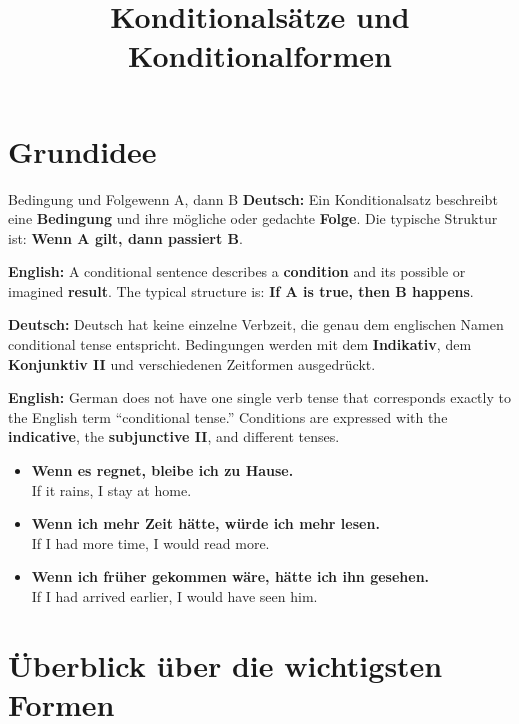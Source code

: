 \documentclass[a4paper,11pt]{article}
\title{Konditionalsätze und Konditionalformen}
\date{}
\newcommand{\GermanText}[1]{\textbf{Deutsch: }#1\par}
\newcommand{\EnglishText}[1]{{\small\color{SoftGray}\textbf{English: }#1\par}}
\newcommand{\ExampleItem}[2]{\item \textbf{#1}\\{\small\color{SoftGray}#2}}
\begin{document}
    \maketitle
    \tableofcontents
    \newpage

    \section{Grundidee}

        \begin{grammarentry}{Bedingung und Folge}{wenn A, dann B}
            \GermanText{Ein Konditionalsatz beschreibt eine \textbf{Bedingung} und ihre mögliche oder gedachte \textbf{Folge}. Die typische Struktur ist: \textbf{Wenn A gilt, dann passiert B}.}
            \EnglishText{A conditional sentence describes a \textbf{condition} and its possible or imagined \textbf{result}. The typical structure is: \textbf{If A is true, then B happens}.}

            \GermanText{Deutsch hat keine einzelne Verbzeit, die genau dem englischen Namen \glqq conditional tense\grqq{} entspricht. Bedingungen werden mit dem \textbf{Indikativ}, dem \textbf{Konjunktiv II} und verschiedenen Zeitformen ausgedrückt.}
            \EnglishText{German does not have one single verb tense that corresponds exactly to the English term ``conditional tense.'' Conditions are expressed with the \textbf{indicative}, the \textbf{subjunctive II}, and different tenses.}
        \end{grammarentry}

        \begin{exbox}
            \begin{itemize}
                \ExampleItem{Wenn es regnet, bleibe ich zu Hause.}{If it rains, I stay at home.}
                \ExampleItem{Wenn ich mehr Zeit hätte, würde ich mehr lesen.}{If I had more time, I would read more.}
                \ExampleItem{Wenn ich früher gekommen wäre, hätte ich ihn gesehen.}{If I had arrived earlier, I would have seen him.}
            \end{itemize}
        \end{exbox}

    \section{Überblick über die wichtigsten Formen}
\end{document}
